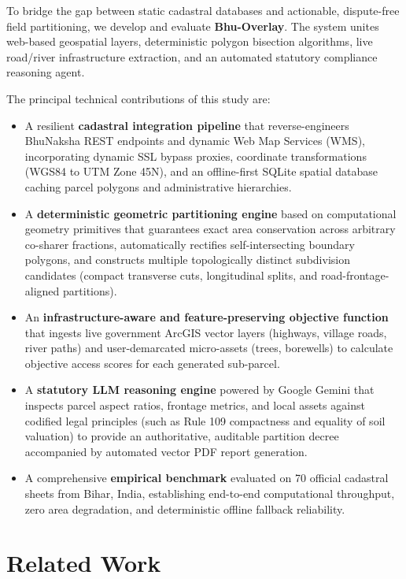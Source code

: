 \documentclass[conference]{IEEEtran}
\begin{document}
To bridge the gap between static cadastral databases and actionable, dispute-free field partitioning, we develop and evaluate \textbf{Bhu-Overlay}. The system unites web-based geospatial layers, deterministic polygon bisection algorithms, live road/river infrastructure extraction, and an automated statutory compliance reasoning agent.

The principal technical contributions of this study are:
\begin{itemize}
    \item A resilient \textbf{cadastral integration pipeline} that reverse-engineers BhuNaksha REST endpoints and dynamic Web Map Services (WMS), incorporating dynamic SSL bypass proxies, coordinate transformations (WGS84 to UTM Zone 45N), and an offline-first SQLite spatial database caching parcel polygons and administrative hierarchies.
    \item A \textbf{deterministic geometric partitioning engine} based on computational geometry primitives that guarantees exact area conservation across arbitrary co-sharer fractions, automatically rectifies self-intersecting boundary polygons, and constructs multiple topologically distinct subdivision candidates (compact transverse cuts, longitudinal splits, and road-frontage-aligned partitions).
    \item An \textbf{infrastructure-aware and feature-preserving objective function} that ingests live government ArcGIS vector layers (highways, village roads, river paths) and user-demarcated micro-assets (trees, borewells) to calculate objective access scores for each generated sub-parcel.
    \item A \textbf{statutory LLM reasoning engine} powered by Google Gemini that inspects parcel aspect ratios, frontage metrics, and local assets against codified legal principles (such as Rule 109 compactness and equality of soil valuation) to provide an authoritative, auditable partition decree accompanied by automated vector PDF report generation.
    \item A comprehensive \textbf{empirical benchmark} evaluated on 70 official cadastral sheets from Bihar, India, establishing end-to-end computational throughput, zero area degradation, and deterministic offline fallback reliability.
\end{itemize}

\section{Related Work}
\end{document}
